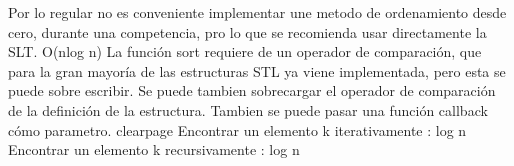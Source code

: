 \markdownRendererDocumentBegin
\markdownRendererSectionBegin
{}\markdownRendererInterblockSeparator
{}Por lo regular no es conveniente implementar une metodo de ordenamiento desde cero, durante una competencia, pro lo que se recomienda usar directamente la SLT.\markdownRendererParagraphSeparator
{} \markdownRendererDollarSign{}O(n\markdownRendererBackslash{}log n)\markdownRendererDollarSign{}\markdownRendererInterblockSeparator
{}\markdownRendererInterblockSeparator
{}\markdownRendererSectionBegin
{}\markdownRendererInterblockSeparator
{}La función \markdownRendererDollarSign{}sort\markdownRendererDollarSign{} requiere de un operador de comparación, que para la gran mayoría de las estructuras STL ya viene implementada, pero esta se puede sobre escribir.\markdownRendererInterblockSeparator
{}\markdownRendererInterblockSeparator
{}Se puede tambien sobrecargar el operador de comparación de la definición de la estructura.\markdownRendererInterblockSeparator
{}\markdownRendererInterblockSeparator
{}Tambien se puede pasar una función callback cómo parametro.\markdownRendererInterblockSeparator
{}\markdownRendererParagraphSeparator
{}\markdownRendererDollarSign{}\markdownRendererBackslash{}clearpage\markdownRendererDollarSign{}\markdownRendererInterblockSeparator
{}
\markdownRendererSectionEnd 
\markdownRendererSectionEnd \markdownRendererSectionBegin
{}\markdownRendererInterblockSeparator
{} Encontrar un elemento k iterativamente\markdownRendererSoftLineBreak
{} : \markdownRendererDollarSign{}\markdownRendererBackslash{}log n\markdownRendererDollarSign{}\markdownRendererInterblockSeparator
{}\markdownRendererParagraphSeparator
{} Encontrar un elemento k recursivamente\markdownRendererSoftLineBreak
{} : \markdownRendererDollarSign{}\markdownRendererBackslash{}log n\markdownRendererDollarSign{}\markdownRendererInterblockSeparator

